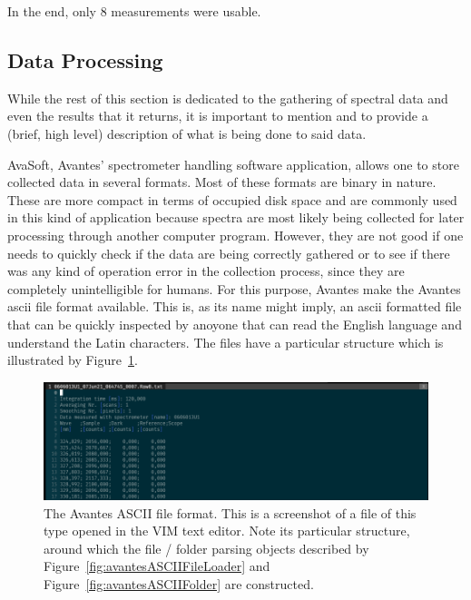 In the end, only 8 measurements were usable. 







\subsection{Data Processing}%
\label{sub:data_processing}

While the rest of this section is dedicated to the gathering of spectral
data and even the results that it returns, it is important to mention
and to provide a (brief, high level) description of what is being done
to said data.

AvaSoft, Avantes' spectrometer handling software application, allows one
to store collected data in several formats. Most of these formats are
binary in nature. These are more compact in terms of occupied disk space
and are commonly used in this kind of application because spectra are
most likely being collected for later processing through another
computer program. However, they are not good if one needs to quickly
check if the data are being correctly gathered or to see if there was
any kind of operation error in the collection process, since they are
completely unintelligible for humans. For this purpose, Avantes make the
Avantes \gls{ascii} file format available. This is, as its name might
imply, an \gls{ascii} formatted file that can be quickly inspected by
anoyone that can read the English language and understand the Latin
characters. The files have a particular structure which is illustrated
by Figure~\ref{fig:avantesASCIIFile}.

\begin{figure}[htpb]
    \centering
    \includegraphics[width=\linewidth]{img/png/avantes_ascii.png}
    \caption{The Avantes ASCII file format. This is a screenshot of a
        file of this type opened in the VIM text editor. Note its
        particular structure, around which the file / folder parsing
        objects described by Figure~\ref{fig:avantesASCIIFileLoader} and
        Figure~\ref{fig:avantesASCIIFolder} are constructed.}
        \label{fig:avantesASCIIFile}
\end{figure}

